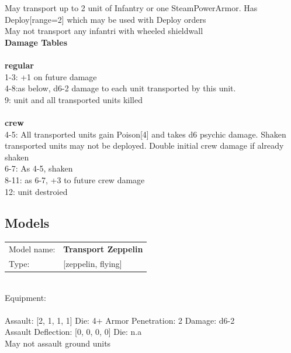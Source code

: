 May transport up to 2 unit of Infantry or one SteamPowerArmor. Has Deploy[range=2] which may be used with Deploy orders\\ 
May not transport any infantri with wheeled shieldwall\\ 



{\bf Damage Tables} \\
\ \\ {\bf regular } \\
1-3: +1 on future damage \\
4-8:as below, d6-2 damage to each unit transported by this unit. \\
9: unit and all transported units killed \\
\ \\ {\bf crew } \\
4-5: All transported units gain Poison[4] and takes d6 psychic damage. Shaken transported units may not be deployed. Double initial crew damage if already shaken \\
6-7: As 4-5, shaken \\
8-11: as 6-7, +3 to future crew damage \\
12: unit destroied \\


\clearpage

\subsection{ Models }

\begin{tabular}{ll}
Model name: & {\bf Transport Zeppelin } \\
Type: & [zeppelin, flying] \\
\end{tabular}
\ \\
Equipment:  \\
\ \\
Assault: [2, 1, 1, 1] Die: 4+ Armor Penetration: 2 Damage: d6-2 \\
Assault Deflection: [0, 0, 0, 0] Die: n.a\\
\indent May not assault ground units\\ 
 
\ \\

\ \\
 
\ \\















